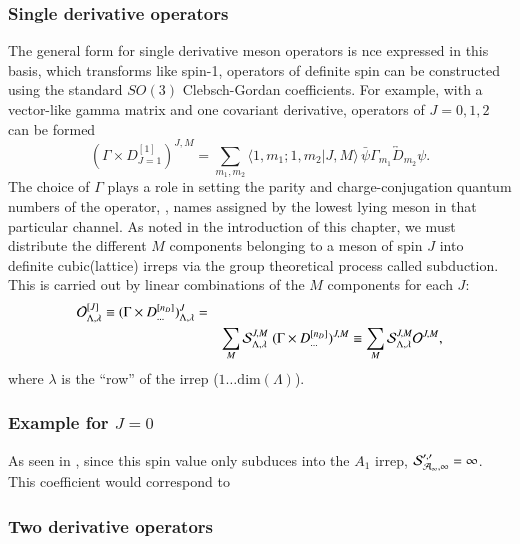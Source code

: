 \subsubsection{Single derivative operators}
The general form for single derivative meson operators is \cite{Dudek_2010} 
nce expressed in this basis, which transforms like spin-1, operators of definite spin can be constructed using the standard $SO(3)$ Clebsch-Gordan coefficients. For example, with a vector-like gamma matrix and one covariant derivative, operators of $J=0,1,2$ can be formed
\begin{equation}
 (\Gamma \times D^{[1]}_{J=1} )^{J, M} = \sum_{m_1, m_2}\big\langle 1, m_1 ; 1, m_2 \big| J, M
  \big\rangle\,  \bar{\psi} \Gamma_{m_1}
  \overleftrightarrow{D}_{m_2} \psi. \nonumber
\end{equation}
The choice of $\Gamma$ plays a role in setting the parity and charge-conjugation quantum numbers of the operator, , names assigned by the lowest lying meson in that particular channel. As noted in the introduction of this chapter, we must distribute the different $M$ components belonging to a meson of spin $J$ into definite cubic(lattice) irreps via the group theoretical process called subduction. This is carried out by linear combinations of the $M$ components for each $J$\cite{Dudek_2010}:
\begin{eqnarray}
{\cal O}^{[J]}_{\Lambda,\lambda} \equiv (\Gamma \times D^{[n_D]}_{\ldots})^J_{\Lambda, \lambda} =  \nonumber\\
& & \sum_M {\cal
     S}^{J,M}_{\Lambda, \lambda}   \; (\Gamma \times
   D^{[n_D]}_{\ldots})^{J,M} \equiv \sum_M {\cal S}^{J,M}_{\Lambda,\lambda} {\cal O}^{J,M}, \nonumber
\end{eqnarray}
where $\lambda$ is the ``row'' of the irrep ($1\ldots\mathrm{dim}(\Lambda)$). 

\subsubsection{Example for $J=0$}
As seen in , since this spin value only subduces into the $A_1$ irrep, $\cal{S}_{A_1,1}^{0,0} = 1$. This coefficient would correspond to 


\subsubsection{Two derivative operators}

